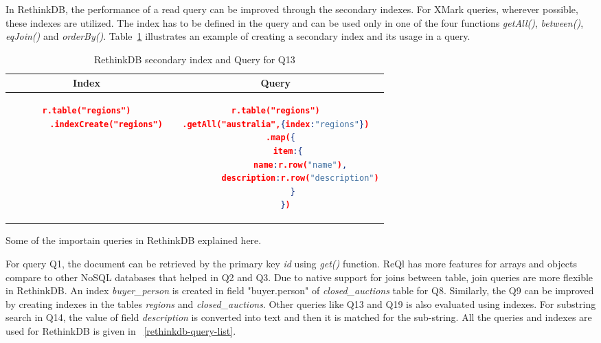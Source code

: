 In RethinkDB, the performance of a read query can be improved through the secondary indexes. For XMark queries,  wherever possible, these indexes are utilized. The index has to be defined in the query and can be used only in one of the four functions \textit{getAll()}, \textit{between()}, \textit{eqJoin()} and \textit{orderBy()}. Table~\ref{tbl:rethinkdb-index-query} illustrates an example of creating a secondary index and its usage in a query.
\begin{longtable}{c|c}
	\caption{ RethinkDB secondary index and Query for Q13}
	\label{tbl:rethinkdb-index-query}\\
    {Index} & {Query}\\
	\hline
\begin{minipage}{.3\textwidth}
\begin{lstlisting}[language=JSON,basicstyle=\scriptsize]
    r.table("regions")
        .indexCreate("regions")
\end{lstlisting}
\end{minipage} &
\begin{minipage}{.5\textwidth}
\begin{lstlisting}[language=JSON,basicstyle=\scriptsize]
r.table("regions")
.getAll("australia",{index:"regions"})
    .map({  
       item:{  
          name:r.row("name"),
          description:r.row("description")
       }
    })
\end{lstlisting}
\end{minipage}
\end{longtable}
Some of the importain queries in RethinkDB explained here.


For query Q1, the document can be retrieved by the primary key \textit{id} using \textit{get()} function.  ReQl has more features for arrays and objects compare to  other NoSQL databases that helped in Q2 and Q3. Due to native support for joins between table, join queries are more flexible in RethinkDB. An index \textit{buyer\_person} is created in field "buyer.person" of \textit{closed\_auctions} table for Q8. Similarly, the Q9 can be improved by creating indexes in the tables \textit{regions} and \textit{closed\_auctions}. Other queries like Q13 and Q19 is also evaluated using indexes. For substring search in Q14, the value of  field \textit{description} is converted into text and then it is matched for the sub-string. All the queries and indexes are used for RethinkDB is given in ~\ref{rethinkdb-query-list}.
